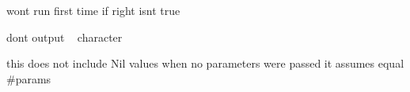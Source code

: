 
\begin{DoxyRefList}
\item[\label{bug__bug000001}%
\hypertarget{bug__bug000001}{}%
Member \hyperlink{classLoop_a661edc5e6b0f90787e2a55922109f110}{Loop\+:\+:execute} (\hyperlink{classEnvironment}{Environment} \&env)]won\textquotesingle{}t run first time if right isn\textquotesingle{}t true  
\item[\label{bug__bug000002}%
\hypertarget{bug__bug000002}{}%
Member \hyperlink{classNode_ad2758f63dc60560b83e1d8a038df6e86}{Node\+:\+:execute} (\hyperlink{classEnvironment}{Environment} \&env)]don\textquotesingle{}t output ~\newline
 character 

this does not include Nil values when no parameters were passed it assumes equal \#params 
\end{DoxyRefList}